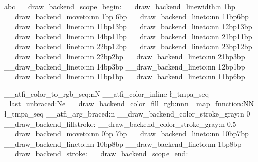 \documentclass{article}
\begin{document}
abc
%
%
\ExplSyntaxOn
\__draw_backend_scope_begin:
\__draw_backend_linewidth:n {1bp}
\__draw_backend_moveto:nn {1bp} {6bp}
\__draw_backend_lineto:nn {11bp}{6bp}
\__draw_backend_lineto:nn {11bp}{13bp}
\__draw_backend_lineto:nn {12bp}{13bp}
\__draw_backend_lineto:nn {14bp}{11bp}
\__draw_backend_lineto:nn {21bp}{11bp}
\__draw_backend_lineto:nn {22bp}{12bp}
\__draw_backend_lineto:nn {23bp}{12bp}
\__draw_backend_lineto:nn {22bp}{2bp}
\__draw_backend_lineto:nn {21bp}{3bp}
\__draw_backend_lineto:nn {14bp}{3bp}
\__draw_backend_lineto:nn {12bp}{1bp}
\__draw_backend_lineto:nn {11bp}{1bp}
\__draw_backend_lineto:nn {11bp}{6bp}

\__atfi_color_to_rgb_seq:nN {__atfi_color_inline} \l_tmpa_seq
   \exp_last_unbraced:Ne \__draw_backend_color_fill_rgb:nnn
     { \seq_map_function:NN \l_tmpa_seq \__atfi_arg_braced:n }
\__draw_backend_color_stroke_gray:n {0}
\__draw_backend_fillstroke:
\__draw_backend_color_stroke_gray:n {0.5}
\__draw_backend_moveto:nn {0bp} {7bp}
\__draw_backend_lineto:nn {10bp}{7bp}
\__draw_backend_lineto:nn {10bp}{8bp}
\__draw_backend_lineto:nn {1bp}{8bp}
\__draw_backend_stroke:
\__draw_backend_scope_end:
\ExplSyntaxOff

\end{document}
